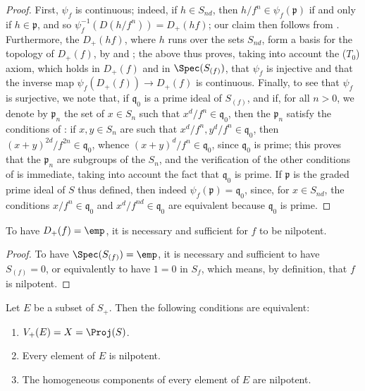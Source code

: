 \begin{proof}
First, $\psi_f$ is continuous;
indeed, if $h\in S_{nd}$, then $h/f^n\in\psi_f(\mathfrak{p})$ if and only if $h\in\mathfrak{p}$, and so $\psi_f^{-1}(D(h/f^n))=D_+(hf)$; our claim then follows from .
Furthermore, the $D_+(hf)$, where $h$ runs over the sets $S_{nd}$, form a basis for the topology of $D_+(f)$, by  and ;
the
above thus proves, taking into account the ($T_0$) axiom, which holds in $D_+(f)$ and in $\Spec(S_{(f)})$, that $\psi_f$ is injective and that the inverse map $\psi_f(D_+(f))\to D_+(f)$ is continuous.
Finally, to see that $\psi_f$ is surjective, we note that, if $\mathfrak{q}_0$ is a prime ideal of $S_{(f)}$, and if, for all $n>0$, we denote by $\mathfrak{p}_n$ the set of $x\in S_n$ such that $x^d/f^n\in\mathfrak{q}_0$, then the $\mathfrak{p}_n$ satisfy the conditions of :
if $x,y\in S_n$ are such that $x^d/f^n,y^d/f^n\in\mathfrak{q}_0$, then $(x+y)^{2d}/f^{2n}\in\mathfrak{q}_0$, whence $(x+y)^d/f^n\in\mathfrak{q}_0$, since $\mathfrak{q}_0$ is prime;
this proves that the $\mathfrak{p}_n$ are subgroups of the $S_n$, and the verification of the other conditions of  is immediate, taking into account the fact that $\mathfrak{q}_0$ is prime.
If $\mathfrak{p}$ is the graded prime ideal of $S$ thus defined, then indeed $\psi_f(\mathfrak{p})=\mathfrak{q}_0$, since, for $x\in S_{nd}$, the conditions $x/f^n\in\mathfrak{q}_0$ and $x^d/f^{nd}\in\mathfrak{q}_0$ are equivalent because $\mathfrak{q}_0$ is prime.
\end{proof}

\begin{corollary}[2.3.7]
\label{II.2.3.7}
To have $D_+(f)=\emp$, it is necessary and sufficient for $f$ to be nilpotent.
\end{corollary}

\begin{proof}
To have $\Spec(S_{(f)})=\emp$, it is necessary and sufficient to have $S_{(f)}=0$, or equivalently to have $1=0$ in $S_f$, which means, by definition, that $f$ is nilpotent.
\end{proof}

\begin{corollary}[2.3.8]
\label{II.2.3.8}
Let $E$ be a subset of $S_+$.
Then the following conditions are equivalent:
\begin{enumerate}
  \item[{\rm(a)}] $V_+(E) = X = \Proj(S)$.
  \item[{\rm(b)}] Every element of $E$ is nilpotent.
  \item[{\rm(c)}] The homogeneous components of every element of $E$ are nilpotent.
\end{enumerate}
\end{corollary}

